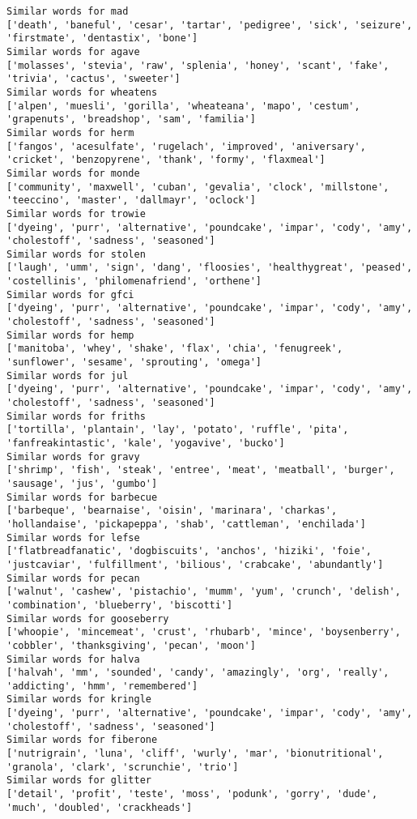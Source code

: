 \documentclass[11pt]{article}
\begin{document}
\begin{Verbatim}[commandchars=\\\{\}]
Similar words for mad
['death', 'baneful', 'cesar', 'tartar', 'pedigree', 'sick', 'seizure', 'firstmate', 'dentastix', 'bone']
Similar words for agave
['molasses', 'stevia', 'raw', 'splenia', 'honey', 'scant', 'fake', 'trivia', 'cactus', 'sweeter']
Similar words for wheatens
['alpen', 'muesli', 'gorilla', 'wheateana', 'mapo', 'cestum', 'grapenuts', 'breadshop', 'sam', 'familia']
Similar words for herm
['fangos', 'acesulfate', 'rugelach', 'improved', 'aniversary', 'cricket', 'benzopyrene', 'thank', 'formy', 'flaxmeal']
Similar words for monde
['community', 'maxwell', 'cuban', 'gevalia', 'clock', 'millstone', 'teeccino', 'master', 'dallmayr', 'oclock']
Similar words for trowie
['dyeing', 'purr', 'alternative', 'poundcake', 'impar', 'cody', 'amy', 'cholestoff', 'sadness', 'seasoned']
Similar words for stolen
['laugh', 'umm', 'sign', 'dang', 'floosies', 'healthygreat', 'peased', 'costellinis', 'philomenafriend', 'orthene']
Similar words for gfci
['dyeing', 'purr', 'alternative', 'poundcake', 'impar', 'cody', 'amy', 'cholestoff', 'sadness', 'seasoned']
Similar words for hemp
['manitoba', 'whey', 'shake', 'flax', 'chia', 'fenugreek', 'sunflower', 'sesame', 'sprouting', 'omega']
Similar words for jul
['dyeing', 'purr', 'alternative', 'poundcake', 'impar', 'cody', 'amy', 'cholestoff', 'sadness', 'seasoned']
Similar words for friths
['tortilla', 'plantain', 'lay', 'potato', 'ruffle', 'pita', 'fanfreakintastic', 'kale', 'yogavive', 'bucko']
Similar words for gravy
['shrimp', 'fish', 'steak', 'entree', 'meat', 'meatball', 'burger', 'sausage', 'jus', 'gumbo']
Similar words for barbecue
['barbeque', 'bearnaise', 'oisin', 'marinara', 'charkas', 'hollandaise', 'pickapeppa', 'shab', 'cattleman', 'enchilada']
Similar words for lefse
['flatbreadfanatic', 'dogbiscuits', 'anchos', 'hiziki', 'foie', 'justcaviar', 'fulfillment', 'bilious', 'crabcake', 'abundantly']
Similar words for pecan
['walnut', 'cashew', 'pistachio', 'mumm', 'yum', 'crunch', 'delish', 'combination', 'blueberry', 'biscotti']
Similar words for gooseberry
['whoopie', 'mincemeat', 'crust', 'rhubarb', 'mince', 'boysenberry', 'cobbler', 'thanksgiving', 'pecan', 'moon']
Similar words for halva
['halvah', 'mm', 'sounded', 'candy', 'amazingly', 'org', 'really', 'addicting', 'hmm', 'remembered']
Similar words for kringle
['dyeing', 'purr', 'alternative', 'poundcake', 'impar', 'cody', 'amy', 'cholestoff', 'sadness', 'seasoned']
Similar words for fiberone
['nutrigrain', 'luna', 'cliff', 'wurly', 'mar', 'bionutritional', 'granola', 'clark', 'scrunchie', 'trio']
Similar words for glitter
['detail', 'profit', 'teste', 'moss', 'podunk', 'gorry', 'dude', 'much', 'doubled', 'crackheads']

\end{Verbatim}
\end{document}

